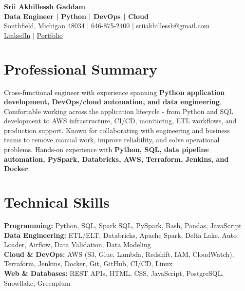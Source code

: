 \documentclass[letterpaper,10pt]{article}
\begin{document}
\fontsize{9.35pt}{10.45pt}\selectfont

\begin{center}
    {\LARGE \textbf{Srii Akhillessh Gaddam}} \\[-1pt]
    \textbf{Data Engineer | Python | DevOps | Cloud} \\[2pt]
    Southfield, Michigan 48034 $|$
    \href{tel:6468752400}{646-875-2400} $|$
    \href{mailto:sriiakhillessh@gmail.com}{sriiakhillessh@gmail.com} \\[1pt]
    \href{https://www.linkedin.com/in/srii-akhiilessh-gaddam-b48668191/}{LinkedIn} $|$
    \href{https://sriiakhillesshg.github.io/portfolio/}{Portfolio}
\end{center}
\vspace{-8pt}

\section{Professional Summary}
\small{Cross-functional engineer with experience spanning \textbf{Python application development, DevOps/cloud automation, and data engineering}. Comfortable working across the application lifecycle - from Python and SQL development to AWS infrastructure, CI/CD, monitoring, ETL workflows, and production support. Known for collaborating with engineering and business teams to remove manual work, improve reliability, and solve operational problems. Hands-on experience with \textbf{Python, SQL, data pipeline automation, PySpark, Databricks, AWS, Terraform, Jenkins, and Docker}.}

\section{Technical Skills}
\small{
\textbf{Programming:} Python, SQL, Spark SQL, PySpark, Bash, Pandas, JavaScript \\
\textbf{Data Engineering:} ETL/ELT, Databricks, Apache Spark, Delta Lake, Auto Loader, Airflow, Data Validation, Data Modeling \\
\textbf{Cloud \& DevOps:} AWS (S3, Glue, Lambda, Redshift, IAM, CloudWatch), Terraform, Jenkins, Docker, Git, GitHub, CI/CD, Linux \\
\textbf{Web \& Databases:} REST APIs, HTML, CSS, JavaScript, PostgreSQL, Snowflake, Greenplum
}

\end{document}
